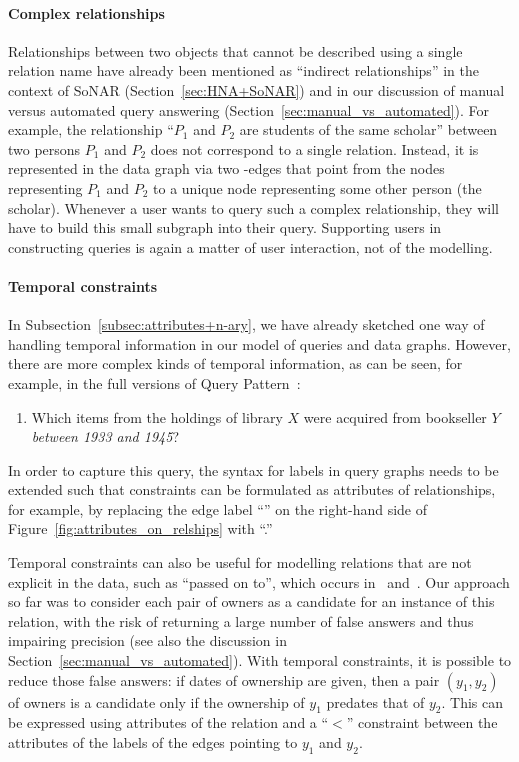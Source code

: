 \paragraph{Complex relationships}

Relationships between two objects that cannot be described using a single relation name
have already been mentioned as \enquote{indirect relationships}
in the context of SoNAR (Section~\ref{sec:HNA+SoNAR})
and in our discussion of manual versus automated query answering (Section~\ref{sec:manual_vs_automated}).
For example, the relationship \enquote{$P_1$ and $P_2$ are students of the same scholar}
between two persons $P_1$ and $P_2$ does not correspond to a single relation.
Instead, it is represented in the data graph 
via two -edges that point from the nodes representing $P_1$ and $P_2$
to a unique node representing some other person (the scholar).
Whenever a user wants to query such a complex relationship, they will
have to build this small subgraph into their query.
Supporting users in constructing queries is again a matter of user interaction,
not of the modelling.

\paragraph{Temporal constraints}

In Subsection~\ref{subsec:attributes+n-ary}, we have already sketched one way of handling
temporal information in our model of queries and data graphs.
However, there are more complex kinds of temporal information,
as can be seen, for example, in the full versions of Query Pattern~:
%
\begin{enumerate}
  \item[\exaquery{5}]
    Which items from the holdings of library $X$ were acquired from bookseller $Y$
    \emph{between 1933 and 1945}?
\end{enumerate}
%
In order to capture this query, the syntax for labels in query graphs needs to be extended such that
constraints can be formulated as attributes of relationships,
for example, 
by replacing the edge label \enquote{}
on the right-hand side of Figure~\ref{fig:attributes_on_relships}
with \enquote{.}

Temporal constraints can also be useful for modelling relations
that are not explicit in the data, such as \enquote{passed on to}, which occurs in~ and~.
Our approach so far was to consider each pair of owners as a candidate for an instance of this relation,
with the risk of returning a large number of false answers and thus impairing precision
(see also the discussion in Section~\ref{sec:manual_vs_automated}).
With temporal constraints, it is possible to reduce those false answers:
if dates of ownership are given, then a pair $(y_1,y_2)$ of owners
is a candidate only if the ownership of $y_1$ predates that of $y_2$.
This can be expressed using attributes of the  relation
and a \enquote{$<$} constraint between the attributes of the  labels
of the edges pointing to $y_1$ and $y_2$.


